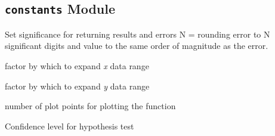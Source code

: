 \documentclass[a4paper,10pt,english]{sphinxmanual}
\begin{document}
\subsection{\texttt{constants} Module}
\label{index:constants-module}\label{index:module-kafe.constants}\label{index:module-constants}

\begin{fulllineitems}
\label{index:kafe.constants.F_SIGNIFICANCE}
Set significance for returning results and errors
N = rounding error to N significant digits and value
to the same order of magnitude as the error.

\end{fulllineitems}


\begin{fulllineitems}
\label{index:kafe.constants.G_PADDING_FACTOR_X}
factor by which to expand \emph{x} data range

\end{fulllineitems}


\begin{fulllineitems}
\label{index:kafe.constants.G_PADDING_FACTOR_Y}
factor by which to expand \emph{y} data range

\end{fulllineitems}


\begin{fulllineitems}
\label{index:kafe.constants.G_PLOT_POINTS}
number of plot points for plotting the function

\end{fulllineitems}


\begin{fulllineitems}
\label{index:kafe.constants.M_CONFIDENCE_LEVEL}
Confidence level for hypothesis test

\end{fulllineitems}
\end{document}
